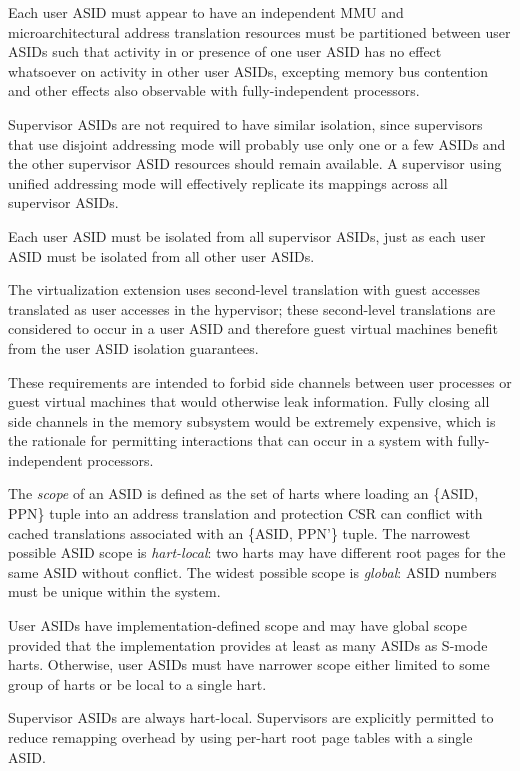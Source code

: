 Each user ASID must appear to have an independent MMU and
microarchitectural address translation resources must be partitioned
between user ASIDs such that activity in or presence of one user ASID has
no effect whatsoever on activity in other user ASIDs, excepting memory bus
contention and other effects also observable with fully-independent
processors.

Supervisor ASIDs are not required to have similar isolation, since
supervisors that use disjoint addressing mode will probably use only one or
a few ASIDs and the other supervisor ASID resources should remain
available.  A supervisor using unified addressing mode will effectively
replicate its mappings across all supervisor ASIDs.

Each user ASID must be isolated from all supervisor ASIDs, just as each
user ASID must be isolated from all other user ASIDs.

The virtualization extension uses second-level translation with guest
accesses translated as user accesses in the hypervisor; these second-level
translations are considered to occur in a user ASID and therefore guest
virtual machines benefit from the user ASID isolation guarantees.

\begin{commentary}
These requirements are intended to forbid side channels between user
processes or guest virtual machines that would otherwise leak information.
Fully closing all side channels in the memory subsystem would be extremely
expensive, which is the rationale for permitting interactions that can
occur in a system with fully-independent processors.
\end{commentary}

The {\em scope} of an ASID is defined as the set of harts where loading an
\{ASID, PPN\} tuple into an address translation and protection CSR can
conflict with cached translations associated with an \{ASID, PPN'\} tuple.
The narrowest possible ASID scope is {\em hart-local}: two harts may have
different root pages for the same ASID without conflict.  The widest
possible scope is {\em global}: ASID numbers must be unique within the
system.

User ASIDs have implementation-defined scope and may have global scope
provided that the implementation provides at least as many ASIDs as S-mode
harts.  Otherwise, user ASIDs must have narrower scope either limited to
some group of harts or be local to a single hart.

Supervisor ASIDs are always hart-local.  Supervisors are explicitly
permitted to reduce remapping overhead by using per-hart root page tables
with a single ASID.

